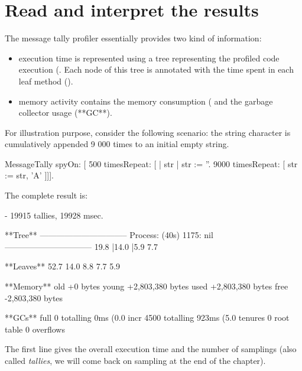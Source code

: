 \documentclass[a4paper,10pt,twoside]{book}
\begin{document}
\section{Read and interpret the results} 
The message tally profiler essentially provides two kind of information:
\begin{itemize}
\item execution time is represented using a tree representing the profiled code execution (. Each node of this tree is annotated with the time spent in each leaf method (). 

\item memory activity contains the memory consumption ( and the garbage collector usage (**GC**).
\end{itemize}

For illustration purpose, consider the following scenario: the string character  is cumulatively appended 9 000 times to an initial empty string.

\begin{code}{}
MessageTally spyOn: 
     [ 500 timesRepeat: [
                     | str |  
                     str := ''. 
                     9000 timesRepeat: [ str := str, 'A' ]]].
\end{code} 

The complete result is:

\begin{code}
 - 19915 tallies, 19928 msec.

**Tree**
--------------------------------
Process: (40s)  1175: nil
--------------------------------
19.8%
  |14.0%
  |5.9%
7.7%

**Leaves**
52.7%
14.0%
8.8%
7.7%
5.9%

**Memory**
	old			+0 bytes
	young		+2,803,380 bytes
	used		+2,803,380 bytes
	free		-2,803,380 bytes

**GCs**
	full			0 totalling 0ms (0.0%
	incr		4500 totalling 923ms (5.0%
	tenures		0
	root table	0 overflows
\end{code}

The first line gives the overall execution time and the number of samplings (also called \emph{tallies}, we will come back on sampling at the end of the chapter). 
\end{document}
